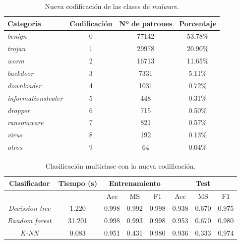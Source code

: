 \begin{table}[H]
	\centering
	\begin{tabular}{ |m{4cm}|c|c|c| }
		\hline
		\rowcolor{LightCyan}
		Categoría                   & Codificación & Nº de patrones & Porcentaje \\
		\hline
		\textit{benign}             & 0  & 77142 & 53.78\% \\
		\textit{trojan}             & 1  & 29978 & 20.90\% \\
		\textit{worm}               & 2  & 16713 & 11.65\% \\
		\textit{backdoor}           & 3  & 7331  & 5.11\% \\
		\textit{downloader}         & 4  & 1031  & 0.72\% \\
		\textit{informationstealer} & 5  & 448   & 0.31\% \\
		\textit{dropper}            & 6  & 715   & 0.50\% \\
		\textit{ransomware}         & 7  & 821   & 0.57\% \\
		\textit{virus}              & 8  & 192   & 0.13\% \\
		\textit{otros}              & 9  & 64    & 0.04\% \\
		\hline
	\end{tabular}
	\caption{Nueva codificación de las clases de \textit{malware}.}
	\label{tabla:nueva_codificacion_malware}
\end{table}

\begin{table}[H]
	\centering
	\begin{tabular}{ |c|c|c|c|c|c|c|c| }
		\hline
		\rowcolor{LightCyan}
		Clasificador & Tiempo (s) & \multicolumn{3}{c|}{Entrenamiento} & \multicolumn{3}{c|}{Test} \\
		\hline
		\rowcolor{LightCyan}
		&            & Acc & MS & F1 & Acc & MS & F1 \\
		\hline
		\textit{Decission tree} & 1.220  & 0.998 & 0.992 & 0.998 & 0.938 & 0.670 & 0.975 \\
		\textit{Random forest}  & 31.201 & 0.998 & 0.993 & 0.998 & 0.953 & 0.670 & 0.980 \\
		\textit{K-NN}           & 0.083  & 0.951 & 0.431 & 0.980 & 0.936 & 0.333 & 0.974 \\
		\hline
	\end{tabular}
	\caption{Clasificación multiclase con la nueva codificación.}
	\label{tabla:multi_new}
\end{table}

\vspace{1em}

